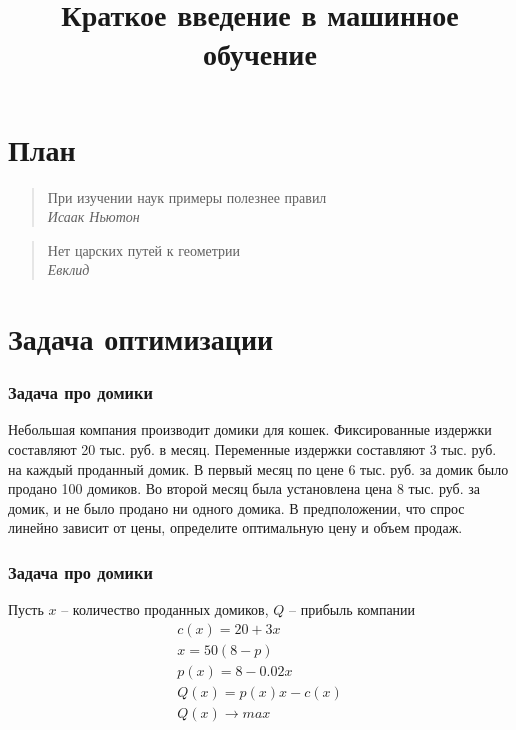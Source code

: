 \documentclass[fullscreen=true, bookmarks=false]{beamer} %
\title{Краткое введение в машинное обучение}
\begin{document}
 \begin{frame}
 \transdissolve[duration=0.2]
 \titlepage
 \end{frame}

\section*{План}

\begin{frame}
\begin{quote}
При изучении наук примеры полезнее правил\\
{\em Исаак Ньютон}
\end{quote}

\begin{quote}
Нет царских путей к геометрии\\
{\em Евклид}
\end{quote}

\end{frame}

\begin{frame}
 \transdissolve[duration=0.2]
 \tableofcontents[]
\end{frame}


\section{Задача оптимизации}


\begin{frame}{}
 \frametitle{Задача про домики}
Небольшая компания производит домики для кошек. Фиксированные издержки составляют 20 тыс. руб. в месяц. Переменные издержки составляют 3 тыс. руб. на каждый проданный домик. В первый месяц по цене 6 тыс. руб. за домик было продано 100 домиков. Во второй месяц была установлена цена 8 тыс. руб. за домик, и не было продано ни одного домика. В предположении, что спрос линейно зависит от цены, определите оптимальную цену и объем продаж.
\end{frame}


\begin{frame}{}
 \frametitle{Задача про домики}
 
Пусть $x$ -- количество проданных домиков, $Q$ -- прибыль компании
\begin{gather*}
\nonumber
 c(x) = 20 + 3x\\
\nonumber
 x = 50(8-p)\\
\nonumber
 p(x) = 8-0.02x\\
\nonumber
 Q(x) = p(x)x - c(x)\\
\nonumber
 Q(x) \rightarrow max
\end{gather*}

\end{frame}
\end{document}
